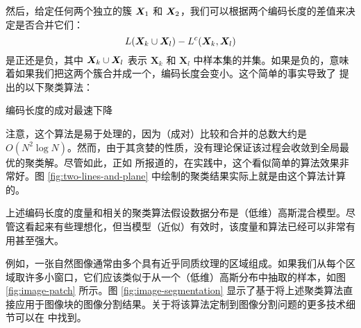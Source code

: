 \documentclass[../../book-main_zh.tex]{subfiles}
\begin{document}
然后，给定任何两个独立的簇 $\bm{X}_1$ 和 $\bm{X}_2$，我们可以根据两个编码长度的差值来决定是否合并它们：
\begin{equation}
	L(\bm{X}_k \cup \bm{X}_l) - L^c(\bm{X}_k, \bm{X}_l)
\end{equation}
是正还是负，其中 $\bm{X}_k \cup \bm{X}_l$ 表示 $\bm X_k$ 和 $\bm X_l$ 中样本集的并集。如果是负的，意味着如果我们把这两个簇合并成一个，编码长度会变小。这个简单的事实导致了 \cite{ma2007segmentation} 提出的以下聚类算法：
\begin{algorithm}[!htbp]
	\caption{编码长度的成对最速下降}\label{alg:steepest_descent_coding_length}
	\begin{algorithmic}[1]

		 
		 
		\State{\Return{\(\cC\)}} 
		\Else
		 
		 
		\EndIf
		\EndWhile
		\State{\Return{\(\cC\)}}  
		\EndProcedure
	\end{algorithmic}
\end{algorithm}

注意，这个算法是易于处理的，因为（成对）比较和合并的总数大约是 $O(N^2\log N)$。然而，由于其贪婪的性质，没有理论保证该过程会收敛到全局最优的聚类解。尽管如此，正如 \cite{ma2007segmentation} 所报道的，在实践中，这个看似简单的算法效果非常好。图 \ref{fig:two-lines-and-plane} 中绘制的聚类结果实际上就是由这个算法计算的。


\begin{example}[图像分割]\label{eg:image-segmentation} 上述编码长度的度量和相关的聚类算法假设数据分布是（低维）高斯混合模型。尽管这看起来有些理想化，但当模型（近似）有效时，该度量和算法已经可以非常有用甚至强大。

	例如，一张自然图像通常由多个具有近乎同质纹理的区域组成。如果我们从每个区域取许多小窗口，它们应该类似于从一个（低维）高斯分布中抽取的样本，如图 \ref{fig:image-patch} 所示。图 \ref{fig:image-segmentation} 显示了基于将上述聚类算法直接应用于图像块的图像分割结果。关于将该算法定制到图像分割问题的更多技术细节可以在 \cite{Mobahi-IJCV2011} 中找到。
\end{example}
\end{document}
